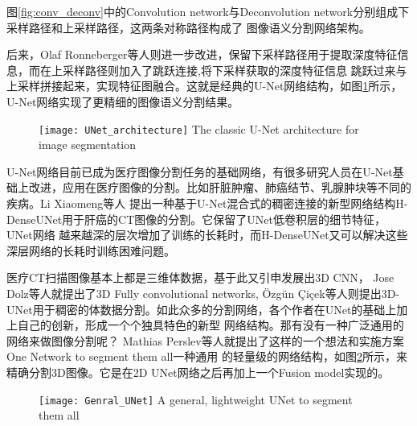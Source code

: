 	图\ref{fig:conv_deconv}中的Convolution network与Deconvolution network分别组成下采样路径和上采样路径，这两条对称路径构成了
	图像语义分割网络架构。
	
	后来，Olaf Ronneberger等人\cite{ronneberger2015u}则进一步改进，保留下采样路径用于提取深度特征信息，而在上采样路径则加入了跳跃连接,将下采样获取的深度特征信息
	跳跃过来与上采样拼接起来，实现特征图融合。这就是经典的U-Net网络结构，如图\ref{fig:UNet}所示，U-Net网络实现了更精细的图像语义分割结果。
	
	\begin{figure}[!htp]
		\centering
		\texttt{[image: UNet\_architecture]}
			{The classic U-Net architecture for image segmentation}
		\label{fig:UNet}
	\end{figure}
	
	U-Net网络目前已成为医疗图像分割任务的基础网络，有很多研究人员在U-Net基础上改进，应用在医疗图像的分割。比如肝脏肿瘤、肺癌结节、乳腺肿块等不同的疾病。Li Xiaomeng等人
	\cite{Li2017HDenseUNetHD}提出一种基于U-Net混合式的稠密连接的新型网络结构H-DenseUNet用于肝癌的CT图像的分割。它保留了UNet低卷积层的细节特征，UNet网络
	越来越深的层次增加了训练的长耗时，而H-DenseUNet又可以解决这些深层网络的长耗时训练困难问题。
	
	医疗CT扫描图像基本上都是三维体数据，基于此又引申发展出3D CNN， Jose Dolz等人\cite{Dolze3DFCN}就提出了3D Fully convolutional networks, {\"O}zg{\"u}n {\c{C}}i{\c{c}}ek等人\cite{cciccek20163d}则提出3D-UNet用于稠密的体数据分割。如此众多的分割网络，各个作者在UNet的基础上加上自己的创新，形成一个个独具特色的新型
	网络结构。那有没有一种广泛通用的网络来做图像分割呢？ Mathias Perslev等人\cite{PerslevGeneralUNetFusion}就提出了这样的一个想法和实施方案
	One Network to segment them all一种通用	的轻量级的网络结构，如图\ref{fig:Genral_UNet}所示，来精确分割3D图像。它是在2D UNet网络之后再加上一个Fusion model实现的。
	\begin{figure}[!htp]
		\centering
		\texttt{[image: Genral\_UNet]}
			{A general, lightweight UNet to segment them all}
		\label{fig:Genral_UNet}
	\end{figure}
	
